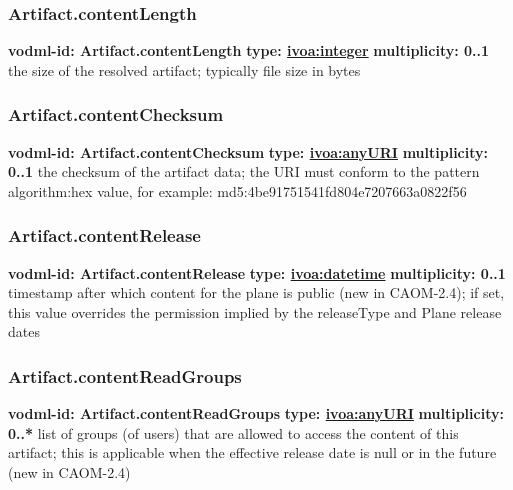     \subsubsection{Artifact.contentLength}
      \textbf{vodml-id: Artifact.contentLength} \newline
      \textbf{type: \hyperref[sect:ivoa]{ivoa:integer}} \newline
      \textbf{multiplicity: 0..1} \newline
      the size of the resolved artifact; typically file size in bytes

    \subsubsection{Artifact.contentChecksum}
      \textbf{vodml-id: Artifact.contentChecksum} \newline
      \textbf{type: \hyperref[sect:ivoa]{ivoa:anyURI}} \newline
      \textbf{multiplicity: 0..1} \newline
      the checksum of the artifact data; the URI must conform to the pattern {algorithm}:{hex value}, for example: md5:4be91751541fd804e7207663a0822f56

    \subsubsection{Artifact.contentRelease}
      \textbf{vodml-id: Artifact.contentRelease} \newline
      \textbf{type: \hyperref[sect:ivoa]{ivoa:datetime}} \newline
      \textbf{multiplicity: 0..1} \newline
      timestamp after which content for the plane is public (new in CAOM-2.4); if set, this value overrides the permission implied by the releaseType and Plane release dates

    \subsubsection{Artifact.contentReadGroups}
      \textbf{vodml-id: Artifact.contentReadGroups} \newline
      \textbf{type: \hyperref[sect:ivoa]{ivoa:anyURI}} \newline
      \textbf{multiplicity: 0..*} \newline
      list of groups (of users) that are allowed to access the content of this artifact; this is applicable when the effective release date is null or in the future (new in CAOM-2.4)

